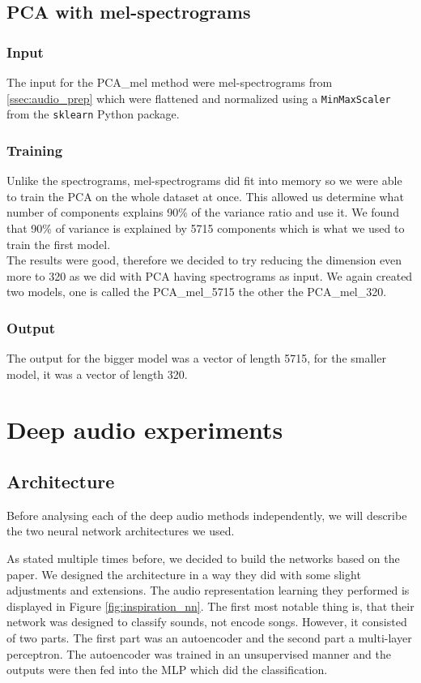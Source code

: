 \subsection{PCA with mel-spectrograms}\label{ssec:pca_mel_experiments}
\subsubsection{Input}
The input for the PCA\_mel method were mel-spectrograms from \ref{ssec:audio_prep} which were flattened and normalized using a \texttt{MinMaxScaler} from the \texttt{sklearn} Python package.

\subsubsection{Training}
Unlike the spectrograms, mel-spectrograms did fit into memory so we were able to train the PCA on the whole dataset at once. This allowed us determine what number of components explains 90\% of the variance ratio and use it. We found that 90\% of variance is explained by 5715 components which is what we used to train the first model. \\
The results were good, therefore we decided to try reducing the dimension even more to 320 as we did with PCA having spectrograms as input. We again created two models, one is called the PCA\_mel\_5715 the other the PCA\_mel\_320. 

\subsubsection{Output}
The output for the bigger model was a vector of length 5715, for the smaller model, it was a vector of length 320.

\section{Deep audio experiments}\label{sec:deep_audio_experiments}

\subsection{Architecture}\label{ssec:nn_architectures}
Before analysing each of the deep audio methods independently, we will describe the two neural network architectures we used. 

As stated multiple times before, we decided to build the networks based on the \cite{inproceedings_RNNs} paper. We designed the architecture in a way they did with some slight adjustments and extensions. The audio representation learning they performed is displayed in Figure \ref{fig:inspiration_nn}. The first most notable thing is, that their network was designed to classify sounds, not encode songs. However, it consisted of two parts. The first part was an autoencoder and the second part a multi-layer perceptron. The autoencoder was trained in an unsupervised manner and the outputs were then fed into the MLP which did the classification.


